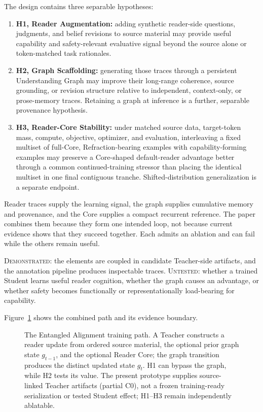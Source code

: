 \documentclass[11pt]{article}
\newcommand{\statusDemonstrated}{\textcolor{implementedGreen}{\textsc{Demonstrated}}}
\newcommand{\statusUntested}{\textcolor{hypothesisBlue}{\textsc{Untested}}}
\begin{document}
The design contains three separable hypotheses:
\begin{enumerate}
    \item \textbf{H1, Reader Augmentation:} adding synthetic reader-side questions, judgments, and belief revisions to source material may provide useful capability and safety-relevant evaluative signal beyond the source alone or token-matched task rationales.
    \item \textbf{H2, Graph Scaffolding:} generating those traces through a persistent Understanding Graph may improve their long-range coherence, source grounding, or revision structure relative to independent, context-only, or prose-memory traces. Retaining a graph at inference is a further, separable provenance hypothesis.
    \item \textbf{H3, Reader-Core Stability:} under matched source data, target-token mass, compute, objective, optimizer, and evaluation, interleaving a fixed multiset of full-Core, Refraction-bearing examples with capability-forming examples may preserve a Core-shaped default-reader advantage better through a common continued-training stressor than placing the identical multiset in one final contiguous tranche. Shifted-distribution generalization is a separate endpoint.
\end{enumerate}

Reader traces supply the learning signal, the graph supplies cumulative memory
and provenance, and the Core supplies a compact recurrent reference. The paper
combines them because they form one intended loop, not because current evidence
shows that they succeed together. Each admits an ablation and can fail while the
others remain useful.

\begin{claimbox}
\statusDemonstrated: the elements are coupled in candidate Teacher-side
artifacts, and the annotation pipeline produces inspectable traces.
\statusUntested: whether a trained Student learns useful reader cognition,
whether the graph causes an advantage, or whether safety becomes functionally
or representationally load-bearing for capability.
\end{claimbox}

Figure~\ref{fig:training-path} shows the combined path and its evidence boundary.

\begin{figure}[ht]
    \centering
    \resizebox{\textwidth}{!}{}
    \caption{The Entangled Alignment training path. A Teacher constructs a reader update from ordered source material, the optional prior graph state $g_{t-1}$, and the optional Reader Core; the graph transition produces the distinct updated state $g_t$. H1 can bypass the graph, while H2 tests its value. The present prototype supplies source-linked Teacher artifacts (partial C0), not a frozen training-ready serialization or tested Student effect; H1--H3 remain independently ablatable.}
    \label{fig:training-path}
\end{figure}
\end{document}
